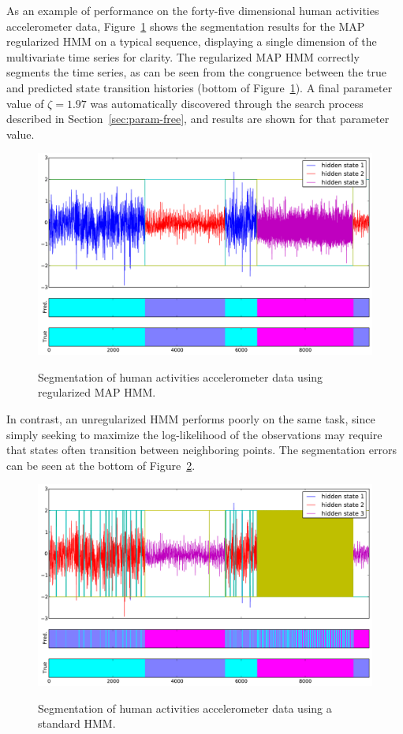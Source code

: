 \documentclass[12pt]{article}
\begin{document}
As an example of performance on the forty-five dimensional human activities accelerometer data, Figure~\ref{fig:real-results-MAP} shows the segmentation results for the MAP regularized HMM on a typical sequence, displaying a single dimension of the multivariate time series for clarity. The regularized MAP HMM correctly segments the time series, as can be seen from the congruence between the true and predicted state transition histories (bottom of Figure~\ref{fig:real-results-MAP}). A final parameter value of $\zeta = 1.97$ was automatically discovered through the search process described in Section~\ref{sec:param-free}, and results are shown for that parameter value.

\begin{figure}[htbp]
  \caption{Segmentation of human activities accelerometer data using regularized MAP HMM.}
  \centering
    \includegraphics[width=0.8\linewidth]{images/MAP_PARAM_FREE_results_hard_activity_long_1,97_3_states.pdf}
    \label{fig:real-results-MAP}
\end{figure}

In contrast, an unregularized HMM performs poorly on the same task, since simply seeking to maximize the log-likelihood of the observations may require that states often transition between neighboring points. The segmentation errors can be seen at the bottom of Figure~\ref{fig:real-results-HMM}.

\begin{figure}[htbp]
  \caption{Segmentation of human activities accelerometer data using a standard HMM.}
  \centering
    \includegraphics[width=0.8\linewidth]{images/std_hmm_results_hard_activity_3_states.pdf}
    \label{fig:real-results-HMM}
\end{figure}
\end{document}
